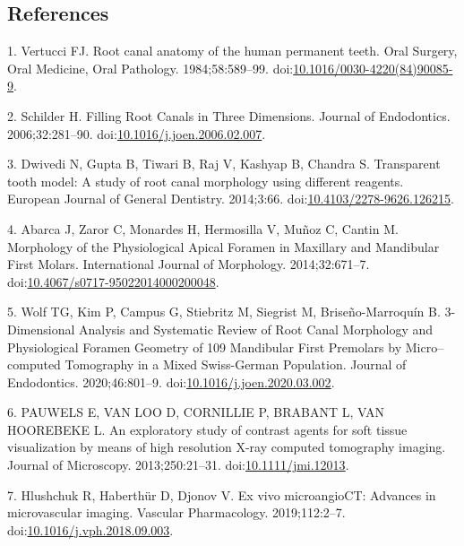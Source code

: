 \documentclass[
  american,
]{article}
\newenvironment{cslreferences}%
  {}%
  {\par}
\begin{document}
\hypertarget{references}{%
\subsection{References}\label{references}}

\hypertarget{refs}{}
\begin{cslreferences}
\leavevmode\hypertarget{ref-q3HKadWY}{}%
1. Vertucci FJ. Root canal anatomy of the human permanent teeth. Oral Surgery, Oral Medicine, Oral Pathology. 1984;58:589--99. doi:\href{https://doi.org/10.1016/0030-4220(84)90085-9}{10.1016/0030-4220(84)90085-9}.

\leavevmode\hypertarget{ref-AHVImOFB}{}%
2. Schilder H. Filling Root Canals in Three Dimensions. Journal of Endodontics. 2006;32:281--90. doi:\href{https://doi.org/10.1016/j.joen.2006.02.007}{10.1016/j.joen.2006.02.007}.

\leavevmode\hypertarget{ref-11Kln4Lf0}{}%
3. Dwivedi N, Gupta B, Tiwari B, Raj V, Kashyap B, Chandra S. Transparent tooth model: A study of root canal morphology using different reagents. European Journal of General Dentistry. 2014;3:66. doi:\href{https://doi.org/10.4103/2278-9626.126215}{10.4103/2278-9626.126215}.

\leavevmode\hypertarget{ref-gA7iMD0q}{}%
4. Abarca J, Zaror C, Monardes H, Hermosilla V, Muñoz C, Cantin M. Morphology of the Physiological Apical Foramen in Maxillary and Mandibular First Molars. International Journal of Morphology. 2014;32:671--7. doi:\href{https://doi.org/10.4067/s0717-95022014000200048}{10.4067/s0717-95022014000200048}.

\leavevmode\hypertarget{ref-1HkTk4VKM}{}%
5. Wolf TG, Kim P, Campus G, Stiebritz M, Siegrist M, Briseño-Marroquín B. 3-Dimensional Analysis and Systematic Review of Root Canal Morphology and Physiological Foramen Geometry of 109 Mandibular First Premolars by Micro--computed Tomography in a Mixed Swiss-German Population. Journal of Endodontics. 2020;46:801--9. doi:\href{https://doi.org/10.1016/j.joen.2020.03.002}{10.1016/j.joen.2020.03.002}.

\leavevmode\hypertarget{ref-XahGmSLJ}{}%
6. PAUWELS E, VAN LOO D, CORNILLIE P, BRABANT L, VAN HOOREBEKE L. An exploratory study of contrast agents for soft tissue visualization by means of high resolution X-ray computed tomography imaging. Journal of Microscopy. 2013;250:21--31. doi:\href{https://doi.org/10.1111/jmi.12013}{10.1111/jmi.12013}.

\leavevmode\hypertarget{ref-TYAmre95}{}%
7. Hlushchuk R, Haberthür D, Djonov V. Ex vivo microangioCT: Advances in microvascular imaging. Vascular Pharmacology. 2019;112:2--7. doi:\href{https://doi.org/10.1016/j.vph.2018.09.003}{10.1016/j.vph.2018.09.003}.


\end{cslreferences}
\end{document}

